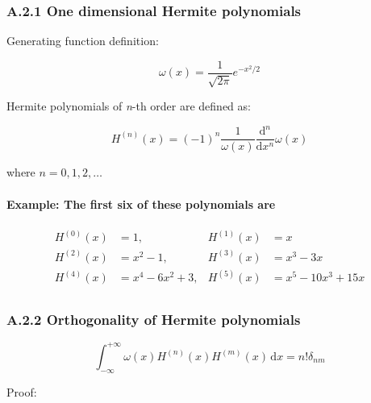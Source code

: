 \documentclass[draft]{article}
\begin{document}
\subsubsection*{\large A.2.1 One dimensional Hermite polynomials}
\renewcommand{\theequation}{A.2.\arabic{equation}}
\setcounter{equation}{0}

Generating function definition:

\begin{equation}
	\omega(x) = \frac{1}{\sqrt{2\pi}} e^{-x^2 / 2}
\end{equation}

Hermite polynomials of \textit{n}-th order are defined as:

\begin{equation}
	H^{(n)} (x) = (-1)^{n} \frac{1}{\omega(x)} \frac{\text{d}^n}{\text{d}x^n} \omega(x)
\end{equation}

where $n = 0, 1, 2, \dots$

\paragraph*{Example: \textnormal{The first six of these polynomials are}}
\begin{align*}
	H^{(0)} (x) &= 1,              & H^{(1)} (x) &= x \\
	H^{(2)} (x) &= x^2 - 1,        & H^{(3)} (x) &= x^3 - 3x \\
	H^{(4)} (x) &= x^4 - 6x^2 + 3, & H^{(5)} (x) &= x^5 - 10x^3 + 15x \\
\end{align*}

\subsubsection*{\large A.2.2 Orthogonality of Hermite polynomials}
\begin{equation}
	\int_{-\infty}^{+\infty} \omega(x) H^{(n)} (x) H^{(m)} (x) \, \text{d}x = n! \delta_{nm} \label{1d_hermite_othogonal}
\end{equation}

Proof:
\end{document}
